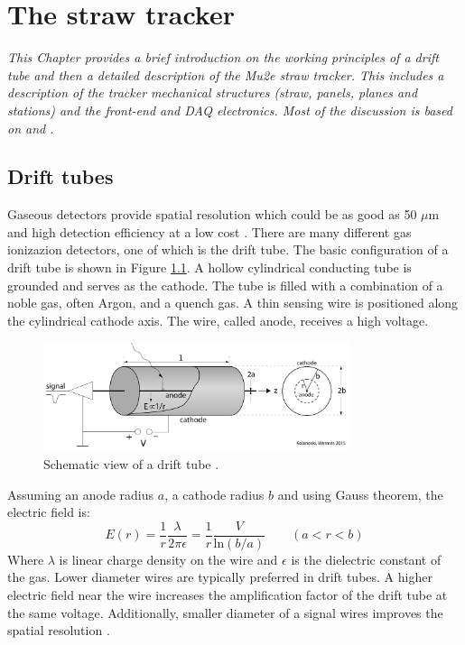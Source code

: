 \chapter{The straw tracker}\label{chaptertrk}

\textit{This Chapter provides a brief introduction on the working principles 
of a drift tube and then a  detailed description of the Mu2e straw tracker. 
This includes a description of the tracker mechanical structures 
(straw, panels, planes and stations) and the front-end and DAQ electronics. 
Most of the discussion is based on \cite{kola} and \cite{bobbb}.}

\section{Drift tubes}
Gaseous detectors provide spatial resolution which could be as good as 50 $\mu$m
and high detection efficiency at a low cost \cite{kola}. 
There are many different gas ionizazion detectors, one of which is the drift tube.
The basic configuration of a drift tube is shown in Figure \ref{fig:drifttube}.
A hollow cylindrical conducting tube is grounded and serves as the cathode.
The tube is filled with a combination of a noble gas, often Argon, and a quench gas. 
A thin sensing wire is positioned along the cylindrical cathode axis. 
The wire, called anode, receives a high voltage. 

\begin{figure}[!h]
    \centering
    \includegraphics[width =0.8\textwidth]{figures/png/Screenshot_20240324_232621.png}
    \caption[Schematic view of a drift tube.]{Schematic view of a drift tube \cite{kola}.}
    \label{fig:drifttube}
    \end{figure}
Assuming an anode radius $a$, a cathode radius $b$ and using Gauss theorem, the electric field is:
\begin{equation}\label{avalanche}
    E(r)=\frac{1}{r}\frac{\lambda}{2\pi \epsilon}=\frac{1}{r}\frac{V}{ \text{ln}(b/a)} \qquad (a<r<b)
\end{equation}
Where $\lambda$ is linear charge density on the wire and $\epsilon$ is the dielectric constant of the gas.
Lower diameter wires are typically preferred in drift tubes.
A higher electric field near the wire increases the amplification factor 
of the drift tube at the same voltage. Additionally, smaller diameter of a signal wires 
improves the spatial resolution \cite{kola}. 
